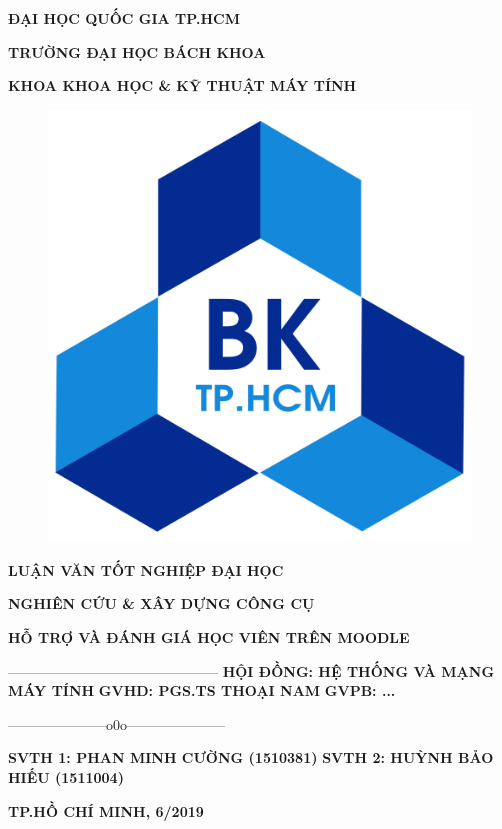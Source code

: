 
\begin{titlepage}
\centerline{\fontsize{15}{15}\bf ĐẠI HỌC QUỐC GIA TP.HCM}
\centerline{\fontsize{15}{15}\bf TRƯỜNG ĐẠI HỌC BÁCH KHOA}
\centerline{\fontsize{15}{15}\bf KHOA KHOA HỌC \& KỸ THUẬT MÁY TÍNH}
\begin{center}
	\begin{figure}[htp]
		\begin{center}
			\includegraphics[scale=0.1]{img/logo}
		\end{center}
	\end{figure}
\end{center}
\centerline{\fontsize{15}{15}\bf LUẬN VĂN TỐT NGHIỆP ĐẠI HỌC}
\vspace*{2cm}
\centerline{\Large\bf NGHIÊN CỨU \& XÂY DỰNG CÔNG CỤ}
\vspace*{0.5cm}
\centerline{\Large\bf HỖ TRỢ VÀ ĐÁNH GIÁ HỌC VIÊN TRÊN MOODLE}
\vskip 0.5cm
\hskip 4.9cm {———————————————}
\vskip 1.5cm
\hskip3cm{\fontsize{15}{15}\bf HỘI ĐỒNG: HỆ THỐNG VÀ MẠNG MÁY TÍNH}
\vskip 0.5cm
\hskip3cm{\fontsize{15}{15}\bf GVHD: PGS.TS THOẠI NAM}
\vskip 0.5cm
\hskip3cm{\fontsize{15}{15}\bf GVPB: ...}
\vskip 0.5cm
\centerline{———————o0o———————}
\vskip 0.5cm
\hskip3cm{\fontsize{15}{15}\bf SVTH 1: PHAN MINH CƯỜNG (1510381)}
\vskip 0.5cm
\hskip3cm{\fontsize{15}{15}\bf SVTH 2: HUỲNH BẢO HIẾU (1511004)}
\vfill
\centerline{\bf TP.HỒ CHÍ MINH, 6/2019}
\end{titlepage}